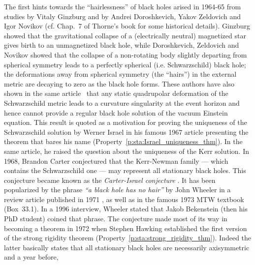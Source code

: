 \begin{hist}
The first hints towards the ``hairlessness'' of black holes arised in 1964-65 from
studies by Vitaly Ginzburg \cite{Ginzb64}
and by Andrei Doroshkevich, Yakov Zeldovich and Igor Novikov \cite{DorosZN65}
(cf.  Chap.~7 of Thorne's book \cite{Thorn94} for
some historical details).
Ginzburg showed that the gravitational collapse of a (electrically neutral) magnetized
star gives birth to an unmagnetized black hole, while
Doroshkevich, Zeldovich and Novikov showed
that the collapse of a non-rotating body slightly departing from spherical symmetry leads to a perfectly spherical (i.e. Schwarzschild) black hole;
the deformations away from spherical symmetry (the ``hairs'') in the external metric
are decaying to zero as the black hole forms. These authors have also shown in the same article~\cite{DorosZN65} that any static quadrupolar
deformation of the Schwarzschild metric leads to a curvature singularity at the event horizon and hence cannot provide a regular black hole
solution of the vacuum Einstein equation.
This result is quoted as a motivation for proving the uniqueness of the Schwarzschild
solution by Werner Israel
in his famous 1967 article \cite{Israe67} presenting the theorem that bares his name
(Property~\ref{p:sta:Israel_uniqueness_thm}). In the same article, he raised
the question about the uniqueness of the Kerr solution.
In 1968, Brandon Carter \cite{Carte68a}
conjectured that the Kerr-Newman family --- which contains the Schwarzschild one ---
may represent all stationary black holes.
This conjecture became known as the
\emph{Carter-Israel conjecture} \cite{Robin09}.
It has been popularized by the phrase
\emph{``a black hole has no hair''} by
John Wheeler
in a review article published in 1971 \cite{RuffiW71},
as well as in the famous 1973 MTW textbook \cite{MisneTW73}
(Box~33.1). In a 1996 interview, Wheeler \cite{Wheel96} stated that Jakob Bekenstein (then his PhD student) coined that phrase.
The conjecture made most of its way in becoming a theorem in 1972 when Stephen Hawking \cite{Hawki72} established the first version of the strong rigidity theorem
(Property~\ref{p:sta:strong_rigidity_thm}). Indeed the latter basically states that all stationary black holes are necessarily axisymmetric and a year before,

\end{hist}
